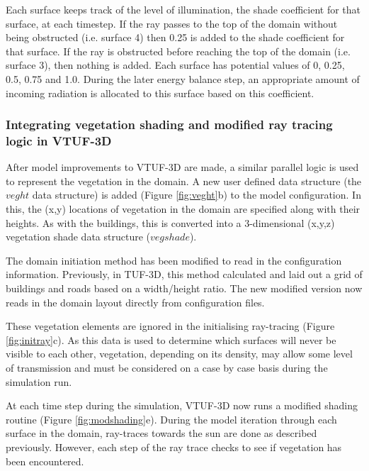 \documentclass[preprint,12pt,authoryear]{elsarticle}
\begin{document}
Each surface keeps track of the level of illumination, the shade coefficient for that surface, at each timestep. If the ray passes to the top of the domain without being obstructed (i.e. surface 4) then 0.25 is added to the shade coefficient for that surface. If the ray is obstructed before reaching the top of the domain (i.e. surface 3), then nothing is added. Each surface has potential values of 0, 0.25, 0.5, 0.75 and 1.0. During the later energy balance step, an appropriate amount of incoming radiation is allocated to this surface based on this coefficient.

\subsubsection{Integrating vegetation shading and modified ray tracing logic in VTUF-3D}\label{sec:Representationofvegetation}

After model improvements to VTUF-3D are made, a similar parallel logic is used to represent the vegetation in the domain. A new user defined data structure (the $veght$ data structure) is added (Figure \ref{fig:veght}b) to the model configuration. In this, the (x,y) locations of vegetation in the domain are specified along with their heights. As with the buildings, this is converted into a 3-dimensional (x,y,z) vegetation shade data structure ($vegshade$). 


The domain initiation method has been modified to read in the configuration information. Previously, in TUF-3D, this method calculated and laid out a grid of buildings and roads based on a width/height ratio. The new modified version now reads in the domain layout directly from configuration files. 

These vegetation elements are ignored in the initialising ray-tracing (Figure \ref{fig:initray}c). As this data is used to determine which surfaces will never be visible to each other, vegetation, depending on its density, may allow some level of transmission and must be considered on a case by case basis during the simulation run.

At each time step during the simulation, VTUF-3D now runs a modified shading routine (Figure \ref{fig:modshading}e). During the model iteration through each surface in the domain, ray-traces towards the sun are done as described previously. However, each step of the ray trace checks to see if vegetation has been encountered. 
\end{document}
